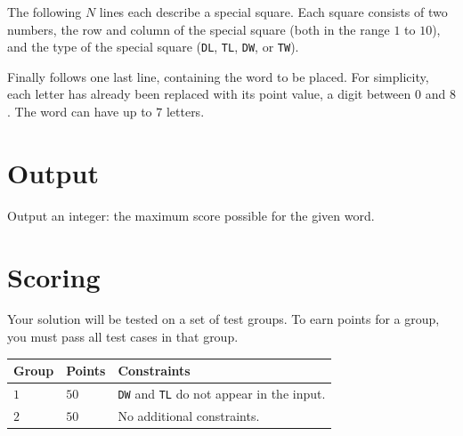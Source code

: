 The following $N$ lines each describe a special square. Each square consists of two numbers, the row and
column of the special square (both in the range $1$ to $10$), and the type of the special square (\texttt{DL}, \texttt{TL}, \texttt{DW}, or \texttt{TW}).

Finally follows one last line, containing the word to be placed. For simplicity, each letter has already been replaced with its point value, a digit between $0$ and $8$. The word can have up to $7$ letters.

\section*{Output}
Output an integer: the maximum score possible for the given word.

\section*{Scoring}
Your solution will be tested on a set of test groups.
To earn points for a group, you must pass all test cases in that group.

\noindent
\begin{tabular}{| l | l | p{12cm} |}
  \hline
  \textbf{Group} & \textbf{Points} & \textbf{Constraints} \\ \hline
  $1$    & $50$          & \texttt{DW} and \texttt{TL} do not appear in the input.  \\ \hline
  $2$    & $50$          & No additional constraints.  \\ \hline
\end{tabular}
